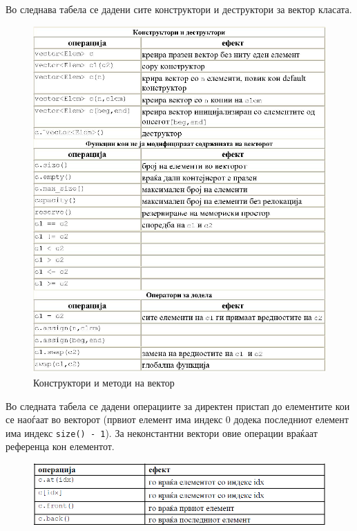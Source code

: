 Во следнава табела се дадени сите конструктори и деструктори за вектор класата.
\begin{figure}[htb]
\centering
\includegraphics[width=\textwidth]{images/vector}
\caption{Конструктори и методи на вектор}
\label{fig:vector}
\end{figure}

Во следната табела се дадени операциите за директен пристап до елементите кои се
наоѓаат во векторот (првиот елемент има индекс 0 додека последниот елемент има
индекс \texttt{size() - 1}). За неконстантни вектори овие операции враќаат
референца кон елементот.


\begin{figure}[htb]
\centering
\includegraphics[width=\textwidth]{images/operations}
\label{fig:vector_operations}
\end{figure}

